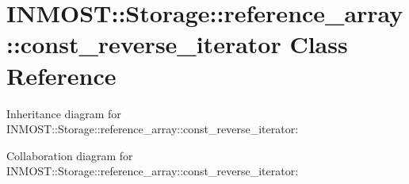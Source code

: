 \hypertarget{classINMOST_1_1Storage_1_1reference__array_1_1const__reverse__iterator}{\section{I\-N\-M\-O\-S\-T\-:\-:Storage\-:\-:reference\-\_\-array\-:\-:const\-\_\-reverse\-\_\-iterator Class Reference}
\label{classINMOST_1_1Storage_1_1reference__array_1_1const__reverse__iterator}
}


Inheritance diagram for I\-N\-M\-O\-S\-T\-:\-:Storage\-:\-:reference\-\_\-array\-:\-:const\-\_\-reverse\-\_\-iterator\-:


Collaboration diagram for I\-N\-M\-O\-S\-T\-:\-:Storage\-:\-:reference\-\_\-array\-:\-:const\-\_\-reverse\-\_\-iterator\-:
